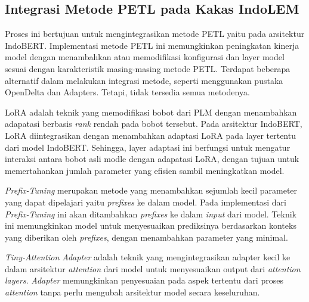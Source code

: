 \subsection{Integrasi Metode PETL pada Kakas IndoLEM}

Proses ini bertujuan untuk mengintegrasikan metode PETL yaitu \methodPETL pada arsitektur IndoBERT. Implementasi metode PETL ini memungkinkan peningkatan kinerja model dengan menambahkan atau memodifikasi konfigurasi dan layer model sesuai dengan karakteristik masing-masing metode PETL. Terdapat beberapa alternatif dalam melakukan integrasi metode, seperti menggunakan pustaka OpenDelta dan Adapters. Tetapi, tidak tersedia semua metodenya.

LoRA adalah teknik yang memodifikasi bobot dari PLM  dengan menambahkan adapatasi berbasis \textit{rank} rendah pada bobot tersebut. Pada arsitektur IndoBERT, LoRA diintegrasikan dengan menambahkan adaptasi LoRA pada layer tertentu dari model IndoBERT. Sehingga, layer adaptasi ini berfungsi untuk mengatur interaksi antara bobot asli modle dengan adapatasi LoRA, dengan tujuan untuk memertahankan jumlah parameter yang efisien sambil meningkatkan model.

\textit{Prefix-Tuning} merupakan metode yang menambahkan sejumlah kecil parameter yang dapat dipelajari yaitu \textit{prefixes} ke dalam model. Pada implementasi dari \textit{Prefix-Tuning} ini akan ditambahkan \textit{prefixes} ke dalam \textit{input} dari model. Teknik ini memungkinkan model untuk menyesuaikan prediksinya berdasarkan konteks yang diberikan oleh \textit{prefixes}, dengan menambahkan parameter yang minimal. 

\textit{Tiny-Attention Adapter} adalah teknik yang mengintegrasikan adapter kecil ke dalam arsitektur \textit{attention} dari model untuk menyesuaikan output dari \textit{attention layers}. \textit{Adapter} memungkinkan penyesuaian pada aspek tertentu dari proses \textit{attention} tanpa perlu mengubah arsitektur model secara keseluruhan.

